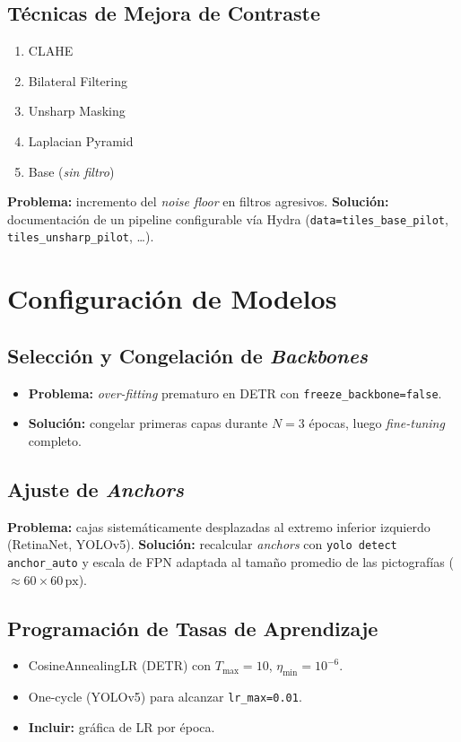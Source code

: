 \subsection{Técnicas de Mejora de Contraste}
\begin{enumerate}
  \renewcommand{\labelenumi}{\alph{enumi})}
  \renewcommand{\theenumi}{\alph{enumi}}
  \item CLAHE
  \item Bilateral Filtering
  \item Unsharp Masking
  \item Laplacian Pyramid
  \item Base (\emph{sin filtro})
\end{enumerate}
\textbf{Problema:} incremento del \emph{noise floor} en filtros
agresivos.
\textbf{Solución:} documentación de un pipeline
configurable vía Hydra
(\texttt{data=tiles\_base\_pilot}, \texttt{tiles\_unsharp\_pilot}, \dots).

\section{Configuración de Modelos}\label{sec:modelos}

\subsection{Selección y Congelación de \emph{Backbones}}
\begin{itemize}
   \item \textbf{Problema:} \emph{over-fitting} prematuro en DETR
         con \texttt{freeze\_backbone=false}.
   \item \textbf{Solución:} congelar primeras capas durante
         \(N=3\) épocas, luego \emph{fine-tuning} completo.
\end{itemize}

\subsection{Ajuste de \emph{Anchors}}
\textbf{Problema:} cajas sistemáticamente
desplazadas al extremo inferior izquierdo (RetinaNet, YOLOv5).
\textbf{Solución:} recalcular \emph{anchors}
con \texttt{yolo detect anchor\_auto} y
escala de FPN adaptada al tamaño promedio de las
pictografías (\(\approx 60\times60\,\text{px}\)).

\subsection{Programación de Tasas de Aprendizaje}
\begin{itemize}
   \item CosineAnnealingLR (DETR) con
         \(T_\mathrm{max}=10\), \(\eta_\mathrm{min}=10^{-6}\).
   \item One-cycle (YOLOv5) para alcanzar
         \texttt{lr\_max=0.01}.
   \item \textbf{Incluir:} gráfica de LR por época.
\end{itemize}

